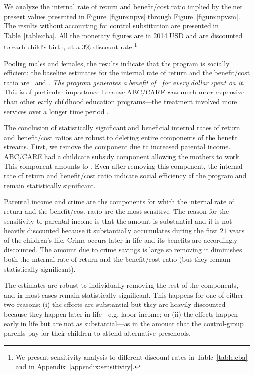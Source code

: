 We analyze the internal rate of return and benefit/cost ratio implied by the net present values presented in Figure~\ref{figure:npvs} through Figure~\ref{figure:npvsm}. The results without accounting for control substitution are presented in Table~\ref{table:cba}. All the monetary figures are in 2014 USD and are discounted to each child's birth, at a $3\%$ discount rate.\footnote{We present sensitivity analysis to different discount rates in Table~\ref{table:cba} and in Appendix~\ref{appendix:sensitivity}.} 

Pooling males and females, the results indicate that the program is socially efficient: the baseline estimates for the internal rate of return and the benefit/cost ratio are \irrp\ and \bcp. \textit{The program generates a benefit of \bcp\ for every dollar spent on it}. This is of particular importance because ABC/CARE was much more expensive than other early childhood education programs---the treatment involved more services over a longer time period \citep{Elango_Hojman_etal_2016_Early-Edu}.

The conclusion of statistically significant and beneficial internal rates of return and benefit/cost ratios are robust to deleting entire components of the benefit streams. First, we remove the component due to increased parental income. ABC/CARE had a childcare subsidy component allowing the mothers to work. This component amounts to \parincomenpvp. Even after removing this component, the internal rate of return and benefit/cost ratio indicate social efficiency of the program and remain statistically significant.

Parental income and crime are the components for which the internal rate of return and the benefit/cost ratio are the most sensitive. The reason for the sensitivity to parental income is that the amount is substantial and it is not heavily discounted because it substantially accumulates during the first $21$ years of the children's life. Crime occurs later in life and its benefits are accordingly discounted. The amount due to crime savings is large so removing it diminishes both the internal rate of return and the benefit/cost ratio (but they remain statistically significant).

The estimates are robust to individually removing the rest of the components, and in most cases remain statistically significant. This happens for one of either two reasons: (i) the effects are substantial but they are heavily discounted because they happen later in life---e.g. labor income; or (ii) the effects happen early in life but are not as substantial---as in the amount that the control-group parents pay for their children to attend alternative preschools.

